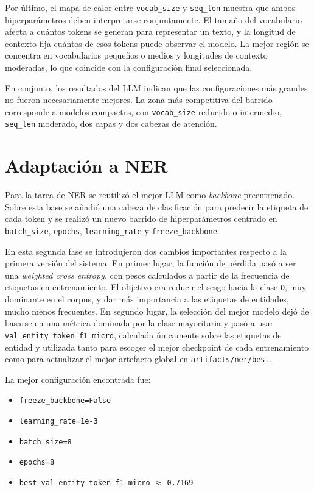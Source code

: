 ﻿\documentclass[11pt,a4paper]{article}
\begin{document}
Por último, el mapa de calor entre \texttt{vocab\_size} y \texttt{seq\_len} muestra que ambos hiperparámetros deben interpretarse conjuntamente. El tamaño del vocabulario afecta a cuántos tokens se generan para representar un texto, y la longitud de contexto fija cuántos de esos tokens puede observar el modelo. La mejor región se concentra en vocabularios pequeños o medios y longitudes de contexto moderadas, lo que coincide con la configuración final seleccionada.

En conjunto, los resultados del LLM indican que las configuraciones más grandes no fueron necesariamente mejores. La zona más competitiva del barrido corresponde a modelos compactos, con \texttt{vocab\_size} reducido o intermedio, \texttt{seq\_len} moderado, dos capas y dos cabezas de atención.

\section{Adaptación a NER}

Para la tarea de NER se reutilizó el mejor LLM como \textit{backbone} preentrenado. Sobre esta base se añadió una cabeza de clasificación para predecir la etiqueta de cada token y se realizó un nuevo barrido de hiperparámetros centrado en \texttt{batch\_size}, \texttt{epochs}, \texttt{learning\_rate} y \texttt{freeze\_backbone}.

En esta segunda fase se introdujeron dos cambios importantes respecto a la primera versión del sistema. En primer lugar, la función de pérdida pasó a ser una \textit{weighted cross entropy}, con pesos calculados a partir de la frecuencia de etiquetas en entrenamiento. El objetivo era reducir el sesgo hacia la clase \texttt{O}, muy dominante en el corpus, y dar más importancia a las etiquetas de entidades, mucho menos frecuentes. En segundo lugar, la selección del mejor modelo dejó de basarse en una métrica dominada por la clase mayoritaria y pasó a usar \texttt{val\_entity\_token\_f1\_micro}, calculada únicamente sobre las etiquetas de entidad y utilizada tanto para escoger el mejor checkpoint de cada entrenamiento como para actualizar el mejor artefacto global en \texttt{artifacts/ner/best}.

La mejor configuración encontrada fue:

\begin{itemize}
    \item \texttt{freeze\_backbone=False}
    \item \texttt{learning\_rate=1e-3}
    \item \texttt{batch\_size=8}
    \item \texttt{epochs=8}
    \item \texttt{best\_val\_entity\_token\_f1\_micro} $\approx$ \texttt{0.7169}
\end{itemize}
\end{document}
